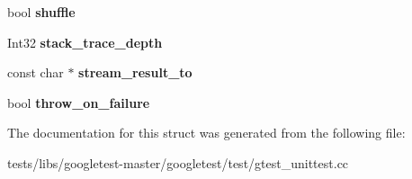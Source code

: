 \begin{DoxyCompactItemize}
bool {\bfseries shuffle}
\item 
\mbox{\label{structtesting_1_1Flags_a20c6592453909c1adace64bf6a2bc2de}} 
Int32 {\bfseries stack\+\_\+trace\+\_\+depth}
\item 
\mbox{\label{structtesting_1_1Flags_ab09849fd3e095d5628dec65ec4dce9e1}} 
const char $\ast$ {\bfseries stream\+\_\+result\+\_\+to}
\item 
\mbox{\label{structtesting_1_1Flags_ab8e7d21e31e641efe47b8050759e001a}} 
bool {\bfseries throw\+\_\+on\+\_\+failure}
\end{DoxyCompactItemize}


The documentation for this struct was generated from the following file\+:\begin{DoxyCompactItemize}
\item 
tests/libs/googletest-\/master/googletest/test/gtest\+\_\+unittest.\+cc\end{DoxyCompactItemize}
